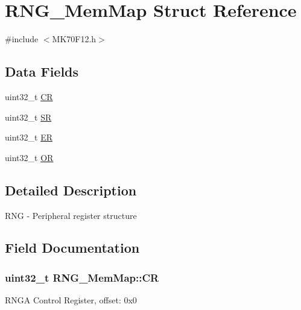 \hypertarget{struct_r_n_g___mem_map}{}\section{R\+N\+G\+\_\+\+Mem\+Map Struct Reference}
\label{struct_r_n_g___mem_map}


{\ttfamily \#include $<$M\+K70\+F12.\+h$>$}

\subsection*{Data Fields}
\begin{DoxyCompactItemize}
\item 
uint32\+\_\+t \hyperlink{struct_r_n_g___mem_map_a45a3eac94c475645b527fcfbef3449b2}{C\+R}
\item 
uint32\+\_\+t \hyperlink{struct_r_n_g___mem_map_a5d258b2ed1915070a6d3651092d8f3c7}{S\+R}
\item 
uint32\+\_\+t \hyperlink{struct_r_n_g___mem_map_a00c023d8dafb81ac55c86b3ad8decb3d}{E\+R}
\item 
uint32\+\_\+t \hyperlink{struct_r_n_g___mem_map_a28a39f4167d28546cea918687d2951f1}{O\+R}
\end{DoxyCompactItemize}


\subsection{Detailed Description}
R\+N\+G -\/ Peripheral register structure 

\subsection{Field Documentation}
\hypertarget{struct_r_n_g___mem_map_a45a3eac94c475645b527fcfbef3449b2}{}
\subsubsection[{C\+R}]{\setlength{\rightskip}{0pt plus 5cm}uint32\+\_\+t R\+N\+G\+\_\+\+Mem\+Map\+::\+C\+R}\label{struct_r_n_g___mem_map_a45a3eac94c475645b527fcfbef3449b2}
R\+N\+G\+A Control Register, offset\+: 0x0 \hypertarget{struct_r_n_g___mem_map_a00c023d8dafb81ac55c86b3ad8decb3d}{}
